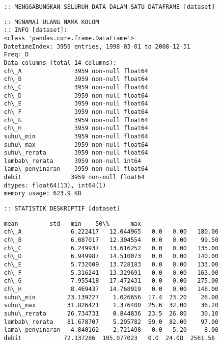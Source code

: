 \documentclass[11pt]{article}
\makeatletter
\newcommand{\boxspacing}{\kern\kvtcb@left@rule\kern\kvtcb@boxsep}
\newcommand{\prompt}[4]{
        \ttfamily\llap{{\color{#2}[#3]:\hspace{3pt}#4}}\vspace{-\baselineskip}
    }
\makeatother
\begin{document}
    \begin{Verbatim}[commandchars=\\\{\}]
:: MENGGABUNGKAN SELURUH DATA DALAM SATU DATAFRAME [dataset]
    \end{Verbatim}

    \begin{Verbatim}[commandchars=\\\{\}]
:: MENAMAI ULANG NAMA KOLOM
:: INFO [dataset]:
<class 'pandas.core.frame.DataFrame'>
DatetimeIndex: 3959 entries, 1998-03-01 to 2008-12-31
Freq: D
Data columns (total 14 columns):
ch\_A               3959 non-null float64
ch\_B               3959 non-null float64
ch\_C               3959 non-null float64
ch\_D               3959 non-null float64
ch\_E               3959 non-null float64
ch\_F               3959 non-null float64
ch\_G               3959 non-null float64
ch\_H               3959 non-null float64
suhu\_min           3959 non-null float64
suhu\_max           3959 non-null float64
suhu\_rerata        3959 non-null float64
lembab\_rerata      3959 non-null int64
lama\_penyinaran    3959 non-null float64
debit              3959 non-null float64
dtypes: float64(13), int64(1)
memory usage: 623.9 KB
    \end{Verbatim}

    \begin{Verbatim}[commandchars=\\\{\}]
:: STATISTIK DESKRIPTIF [dataset]
    \end{Verbatim}

            \begin{tcolorbox}[breakable, size=fbox, boxrule=.5pt, pad at break*=1mm, opacityfill=0]
\prompt{Out}{outcolor}{37}{\boxspacing}
\begin{Verbatim}[commandchars=\\\{\}]
                      mean         std   min    50\%      max
ch\_A              6.222417   12.044965   0.0   0.00   180.00
ch\_B              6.087017   12.304554   0.0   0.00    99.50
ch\_C              6.249937   13.616252   0.0   0.00   135.00
ch\_D              6.949987   14.510073   0.0   0.00   140.00
ch\_E              5.732609   13.728183   0.0   0.00   133.00
ch\_F              5.316241   13.329691   0.0   0.00   163.00
ch\_G              7.955418   17.472431   0.0   0.00   275.00
ch\_H              8.469437   14.768919   0.0   0.00   148.00
suhu\_min         23.139227    1.026656  17.4  23.20    26.00
suhu\_max         31.826421    1.376400  25.6  32.00    36.20
suhu\_rerata      26.734731    0.844836  23.5  26.80    30.10
lembab\_rerata    81.678707    5.295782  59.0  82.00    97.00
lama\_penyinaran   4.840162    2.721498   0.0   5.20     8.00
debit            72.137286  105.077023   0.0  24.08  2561.58
\end{Verbatim}
\end{tcolorbox}
        
\end{document}
